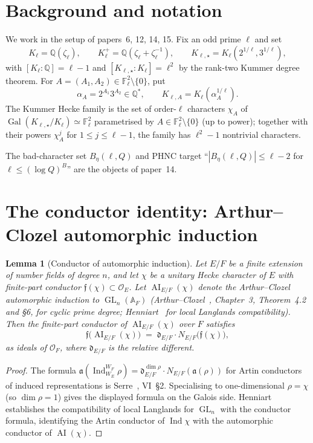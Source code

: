 \documentclass[11pt]{article}
\newtheorem{lemma}{Lemma}
\newcommand{\Q}{\mathbb Q}
\newcommand{\F}{\mathbb F}
\newcommand{\A}{\mathbb A}
\newcommand{\Gal}{\operatorname{Gal}}
\newcommand{\Ind}{\operatorname{Ind}}
\newcommand{\AI}{\operatorname{AI}}
\newcommand{\GL}{\operatorname{GL}}
\begin{document}
\section{Background and notation}

We work in the setup of papers~6, 12, 14, 15.  Fix an odd prime \(\ell\) and set
\[
K_\ell=\Q(\zeta_\ell),\qquad K_\ell^+=\Q(\zeta_\ell+\zeta_\ell^{-1}),\qquad K_{\ell,\star}=K_\ell(2^{1/\ell},3^{1/\ell}),
\]
with \([K_\ell:\Q]=\ell-1\) and \([K_{\ell,\star}:K_\ell]=\ell^2\) by the rank-two Kummer degree theorem.  For \(A=(A_1,A_2)\in\F_\ell^2\setminus\{0\}\), put
\[
\alpha_A=2^{A_1}3^{A_2}\in\Q^*,\qquad K_{\ell,A}=K_\ell(\alpha_A^{1/\ell}).
\]
The Kummer Hecke family is the set of order-\(\ell\) characters \(\chi_A\) of \(\Gal(K_{\ell,\star}/K_\ell)\simeq\F_\ell^2\) parametrised by \(A\in\F_\ell^2\setminus\{0\}\) (up to power); together with their powers \(\chi_A^j\) for \(1\le j\le\ell-1\), the family has \(\ell^2-1\) nontrivial characters.

The bad-character set \(B_\eta(\ell,Q)\) and PHNC target ``\(|B_\eta(\ell,Q)|\le\ell-2\) for \(\ell\le(\log Q)^B\)'' are the objects of paper~14.

\section{The conductor identity: Arthur--Clozel automorphic induction}

\begin{lemma}[Conductor of automorphic induction]\label{L:ind-conductor}
Let \(E/F\) be a finite extension of number fields of degree \(n\), and let \(\chi\) be a unitary Hecke character of \(E\) with finite-part conductor \(\mathfrak f(\chi)\subset\mathcal O_E\).  Let \(\AI_{E/F}(\chi)\) denote the Arthur--Clozel automorphic induction to \(\GL_n(\A_F)\) (Arthur--Clozel~\cite{ArthurClozel}, Chapter~3, Theorem~4.2 and §6, for cyclic prime degree; Henniart~\cite{HenniartLLC} for local Langlands compatibility).  Then the finite-part conductor of \(\AI_{E/F}(\chi)\) over \(F\) satisfies
\[
\mathfrak f\bigl(\AI_{E/F}(\chi)\bigr)\;=\;\mathfrak d_{E/F}\cdot N_{E/F}\bigl(\mathfrak f(\chi)\bigr),
\]
as ideals of \(\mathcal O_F\), where \(\mathfrak d_{E/F}\) is the relative different.
\end{lemma}

\begin{proof}
The formula \(\mathfrak a(\Ind_{W_E}^{W_F}\rho)=\mathfrak d_{E/F}^{\dim\rho}\cdot N_{E/F}(\mathfrak a(\rho))\) for Artin conductors of induced representations is Serre~\cite{SerreLocalFields}, VI~§2.  Specialising to one-dimensional \(\rho=\chi\) (so \(\dim\rho=1\)) gives the displayed formula on the Galois side.  Henniart~\cite{HenniartLLC} establishes the compatibility of local Langlands for \(\GL_n\) with the conductor formula, identifying the Artin conductor of \(\Ind\chi\) with the automorphic conductor of \(\AI(\chi)\).
\end{proof}
\end{document}
